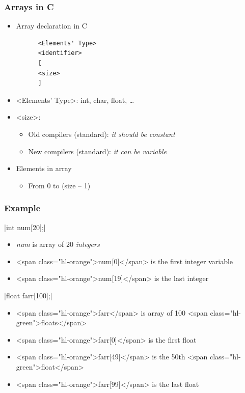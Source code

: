 \documentclass{../c-lecture}
\begin{document}
\begin{frame}[fragile]
  \frametitle{Arrays in C}
  \begin{itemize}
    \item Array declaration in C
    \begin{verbatim}
      <Elements' Type>
      <identifier>
      [
      <size>
      ]
    \end{verbatim}
    \item
      <Elements' Type>: int, char, float,
      \ldots

    \item <size>:
    \begin{itemize}
      \item
        Old compilers (standard):
        \textit{\color{RedOrange} it should be constant}
      \item
        New compilers (standard): \textit{\color{RubineRed} it can be variable}
    \end{itemize}
    \item Elements in array
    \begin{itemize}
      \item From 0 to (size – 1)
    \end{itemize}
  \end{itemize}
\end{frame}

\begin{frame}[fragile]
  \frametitle{Example}
  |int num[20];|
  \begin{itemize}
    \item
      \textit{\color{Orange} num} is array of 20
      \textit{\color{LimeGreen} integers}
    \item <span class="hl-orange">num[0]</span> is the first integer variable
    \item <span class="hl-orange">num[19]</span> is the last integer
  \end{itemize}
  |float farr[100];|
  \begin{itemize}
    \item
      <span class="hl-orange">farr</span> is array of 100
      <span class="hl-green">floats</span>
    \item <span class="hl-orange">farr[0]</span> is the first float
    \item
      <span class="hl-orange">farr[49]</span> is the 50th
      <span class="hl-green">float</span>
    \item <span class="hl-orange">farr[99]</span> is the last float
  \end{itemize}
\end{frame}
\end{document}
